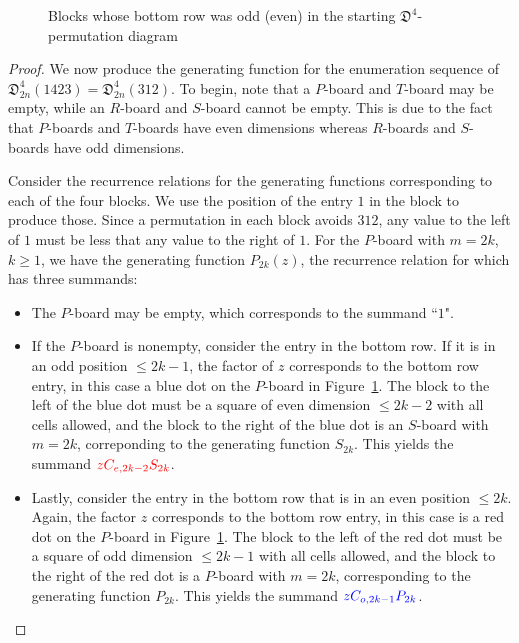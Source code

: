 \documentclass[
final
]{dmtcs-episciences}
\theoremstyle{definition}
\theoremstyle{remark}
\begin{document}
\begin{figure}[!ht]
\begin{center}
\begin{tikzpicture}[scale = 0.45]
\end{tikzpicture} 
\end{center}

\caption{Blocks whose bottom row was odd (even) in the starting $\mathfrak{D}^4$-permutation diagram}
\label{312_odd_even row}
\end{figure}


\begin{proof}
We now produce the generating function for the enumeration sequence of $\mathfrak{D}^4_{2n} (1423) = \mathfrak{D}^4_{2n} (312)$.  To begin, note that a $P$-board and $T$-board may be empty, while an $R$-board and $S$-board cannot be empty.  This is due to the fact that $P$-boards and $T$-boards have even dimensions whereas  $R$-boards and $S$-boards have odd dimensions. 

Consider the recurrence relations for the generating functions corresponding to each of the four blocks. We use the position of the entry $1$ in the block to produce those. Since a permutation in each block avoids $312$, any value to the left of $1$ must be less that any value to the right of $1$. For the $P$-board with $m=2k$, $k\ge 1$, we have the generating function $P_{2k}(z)$, the recurrence relation for which has three summands:
\begin{itemize}
\item The $P$-board may be empty, which corresponds to the summand ``$1$".  
\item If the $P$-board is nonempty, consider the entry in the bottom row. If it is in an odd position $\le 2k-1$, the factor of $z$ corresponds to the bottom row entry, in this case a blue dot on the $P$-board in Figure~\ref{312_odd_even row}. The block to the left of the blue dot must be a square of even dimension $\le 2k-2$ with all cells allowed, and the block to the right of the blue dot is an $S$-board with $m=2k$, correponding to the generating function $S_{2k}$.  This yields the summand ${\color{red}z C_{e,2k-2} S_{2k}}$.
\item Lastly, consider the entry in the bottom row that is in an even position $\le 2k$.  Again, the factor $z$ corresponds to the bottom row entry, in this case is a red dot on the $P$-board in Figure~\ref{312_odd_even row}. The block to the left of the red dot must be a square of odd dimension $\le 2k-1$ with all cells allowed, and the block to the right of the red dot is a $P$-board with $m=2k$, corresponding to the generating function $P_{2k}$.  This yields the summand ${\color{blue}z C_{o,2k-1}P_{2k}}$.
\end{itemize}


\end{proof}
\end{document}
